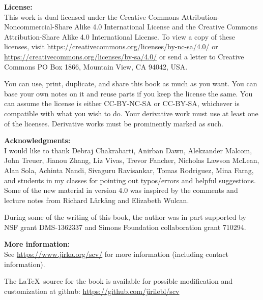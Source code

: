 \documentclass[12pt,openany]{book}
\theoremstyle{plain}
\theoremstyle{remark}
\theoremstyle{definition}
\theoremstyle{exercise}
\theoremstyle{example}
\begin{document}
\bigskip

\noindent
\textbf{License:}
\\
This work
is dual licensed under
the Creative Commons
Attribution-Non\-commercial-Share Alike 4.0 International License and
the Creative Commons
Attribution-Share Alike 4.0 International License.
To view a
copy of these licenses, visit
\url{https://creativecommons.org/licenses/by-nc-sa/4.0/}
or
\url{https://creativecommons.org/licenses/by-sa/4.0/}
or send a letter to
Creative Commons
PO Box 1866, Mountain View, CA 94042, USA\@.

\bigskip

\noindent
You can use, print, duplicate, and share this book as much as you want.  You can
base your own notes on it and reuse parts if you keep the license the
same.  You can assume the license is either CC-BY-NC-SA or CC-BY-SA\@,
whichever is compatible with what you wish to do.
Your derivative work must use at least one of the licenses.
Derivative works must be prominently marked as such.


\bigskip

\noindent
\textbf{Acknowledgments:}
\\
I would like to thank Debraj Chakrabarti, Anirban Dawn, Alekzander Malcom,
John Treuer, Jianou Zhang, Liz Vivas, Trevor Fancher,
Nicholas Lawson McLean, Alan Sola, Achinta Nandi,
Sivaguru Ravisankar,
Tomas Rodriguez,
Mina Farag,
and students in my classes for pointing out typos/errors
and helpful suggestions.
Some of the new material in version 4.0
was inspired by the comments and lecture notes from
Richard L\"ark\"ang and Elizabeth Wulcan.

\bigskip

\noindent
During some of the writing of this book,
the author was in part supported by NSF grant DMS-1362337
and Simons Foundation collaboration grant 710294. 

\bigskip

\noindent
\textbf{More information:}
\\
See \url{https://www.jirka.org/scv/} for more information
(including contact information).

\medskip

\noindent
The \LaTeX\ source for the book is available
for possible modification and customization
at github: \url{https://github.com/jirilebl/scv}
\end{document}
